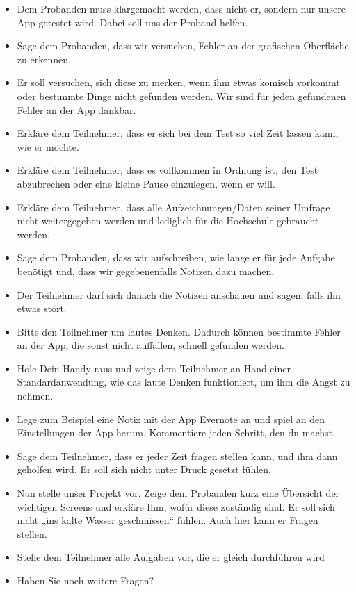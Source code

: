 \begin{itemize}
\item Dem Probanden muss klargemacht werden, dass nicht er, sondern nur unsere App getestet wird. Dabei soll uns der Proband helfen.

\item Sage dem Probanden, dass wir versuchen, Fehler an der grafischen Oberfläche zu erkennen.

\item Er soll versuchen, sich diese zu merken, wenn ihm etwas komisch vorkommt oder bestimmte Dinge nicht gefunden werden. Wir sind für jeden gefundenen Fehler an der App dankbar.

\item Erkläre dem Teilnehmer, dass er sich bei dem Test so viel Zeit lassen kann, wie er möchte.

\item Erkläre dem Teilnehmer, dass es vollkommen in Ordnung ist, den Test abzubrechen oder eine kleine Pause einzulegen, wenn er will.

\item Erkläre dem Teilnehmer, dass alle Aufzeichnungen/Daten seiner Umfrage nicht weitergegeben werden und lediglich für die Hochschule gebraucht werden.

\item Sage dem Probanden, dass wir aufschreiben, wie lange er für jede Aufgabe benötigt und, dass wir gegebenenfalls Notizen dazu machen.

\item Der Teilnehmer darf sich danach die Notizen anschauen und sagen, falls ihn etwas stört. 

\item Bitte den Teilnehmer um lautes Denken. Dadurch können bestimmte Fehler an der App, die sonst nicht auffallen, schnell gefunden werden.

\item Hole Dein Handy raus und zeige dem Teilnehmer an Hand einer Standardanwendung, wie das laute Denken funktioniert, um ihm die Angst zu nehmen. 

\item Lege zum Beispiel eine Notiz mit der App Evernote an und spiel an den Einstellungen der App herum. Kommentiere jeden Schritt, den du machst.

\item Sage dem Teilnehmer, dass er jeder Zeit fragen stellen kann, und ihm dann geholfen wird. Er soll sich nicht unter Druck gesetzt fühlen.

\item Nun stelle unser Projekt vor. Zeige dem Probanden kurz eine Übersicht der wichtigen Screens und erkläre Ihm, wofür diese zuständig sind. Er soll sich nicht „ins kalte Wasser geschmissen“ fühlen. Auch hier kann er Fragen stellen.

\item Stelle dem Teilnehmer alle Aufgaben vor, die er gleich durchführen wird

\item Haben Sie noch weitere Fragen?
\end{itemize}

